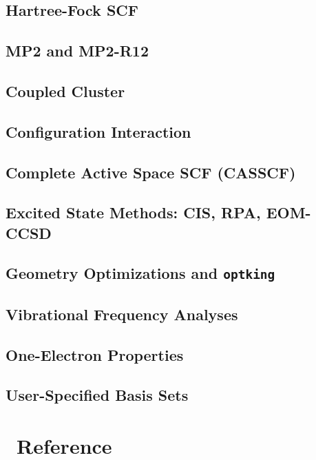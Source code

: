 \documentclass[12pt]{article}
\begin{document}
\subsection{Hartree-Fock SCF}
\subsection{MP2 and MP2-R12}
\subsection{Coupled Cluster}

\subsection{Configuration Interaction}
\subsection{Complete Active Space SCF (CASSCF)}
\subsection{Excited State Methods: CIS, RPA, EOM-CCSD}
\subsection{Geometry Optimizations and {\tt optking}}
\subsection{Vibrational Frequency Analyses}
\subsection{One-Electron Properties}
\subsection{User-Specified Basis Sets}

\newpage
\appendix
\section{\PSIthree\ Reference}\label{PSI_Reference}
%

%



\end{document}

